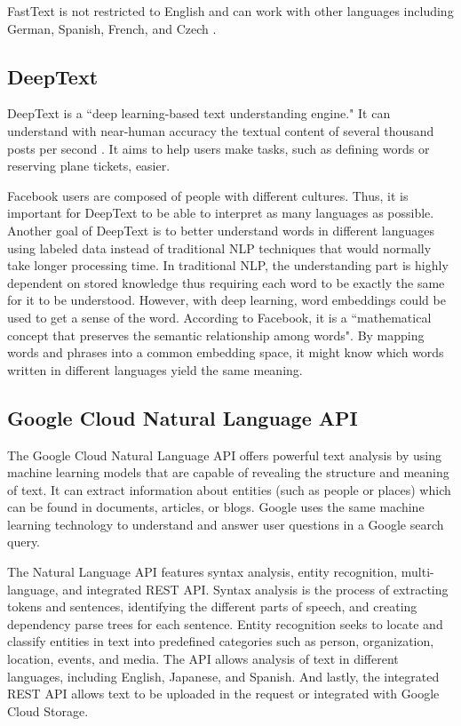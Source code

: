 FastText is not restricted to English and can work with other languages including German, Spanish, French, and Czech \cite{Techcrunch2016}.

\subsection{DeepText}
DeepText is a ``deep learning-based text understanding engine." It can understand with near-human accuracy the textual content of several thousand posts per second \cite{DeepText2016}. It aims to help users make tasks, such as defining words or reserving plane tickets, easier.

Facebook users are composed of people with different cultures. Thus, it is important for DeepText to be able to interpret as many languages as possible. Another goal of DeepText is to better understand words in different languages using labeled data instead of traditional NLP techniques that would normally take longer processing time. In traditional NLP, the understanding part is highly dependent on stored knowledge thus requiring each word to be exactly the same for it to be understood. However, with deep learning, word embeddings could be used to get a sense of the word. According to Facebook, it is a ``mathematical concept that preserves the semantic relationship among words". By mapping words and phrases into a common embedding space, it might know which words written in different languages yield the same meaning.

\subsection{Google Cloud Natural Language API}
The Google Cloud Natural Language API offers powerful text analysis by using machine learning models that are capable of revealing the structure and meaning of text. It can extract information about entities (such as people or places) which can be found in documents, articles, or blogs. Google uses the same machine learning technology to understand and answer user questions in a Google search query.

The Natural Language API features syntax analysis, entity recognition, multi-language, and integrated REST API. Syntax analysis is the process of extracting tokens and sentences, identifying the different parts of speech, and creating dependency parse trees for each sentence. Entity recognition seeks to locate and classify entities in text into predefined categories such as person, organization, location, events, and media. The API allows analysis of text in different languages, including English, Japanese, and Spanish. And lastly, the integrated REST API allows text to be uploaded in the request or integrated with Google Cloud Storage.

